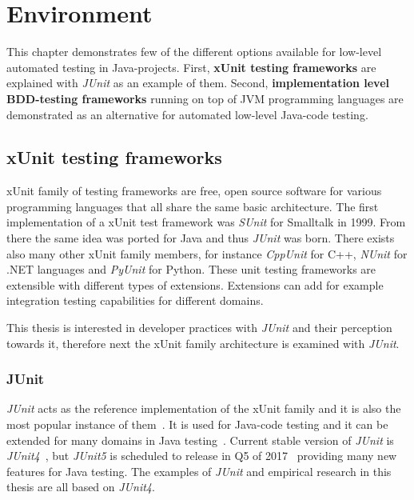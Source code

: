 \chapter{Environment}
\label{chapter:environment}
This chapter demonstrates few of the different options available for low-level automated testing in Java-projects. First,
\textbf{xUnit testing frameworks} are explained with \textit{JUnit} as an example of them. Second, \textbf{implementation level BDD-testing frameworks}
running on top of JVM programming languages are demonstrated as an alternative for automated low-level Java-code testing.

\section{xUnit testing frameworks} %
    xUnit family of testing frameworks are free, open source software for various programming languages that
    all share the same basic architecture. The first implementation of a xUnit test framework was \textit{SUnit}
    for Smalltalk in 1999.  From there the same idea was ported for Java and thus \textit{JUnit} was born. There exists also many other
    xUnit family members, for instance \textit{CppUnit} for C++, \textit{NUnit} for .NET languages and \textit{PyUnit} for Python.
    These unit testing frameworks are extensible with different types of extensions. Extensions can add for example integration testing capabilities
    for different domains. ~\cite{hamill2004unit}

    This thesis is interested in developer practices with \textit{JUnit} and their perception towards it, therefore next the xUnit family architecture
    is examined with \textit{JUnit}.

    \subsection{JUnit}
    \textit{JUnit} acts as the reference implementation of the xUnit family and it is also the most popular instance of them~\cite{hamill2004unit}.
    It is used for Java-code testing and it can be extended for many domains in Java testing~\cite{hamill2004unit}.
    Current stable version of \textit{JUnit} is \textit{JUnit4}~\cite{junit4}, but \textit{JUnit5} is scheduled to release in Q5 of 2017~\cite{junit5schedule}
    providing many new features for Java testing. The examples of \textit{JUnit} and empirical research in this thesis are all based on \textit{JUnit4}.

